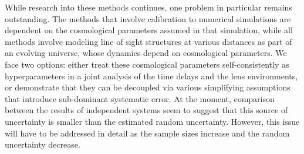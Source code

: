 While research into these methods continues, one problem in particular
remains outstanding. The methods that involve calibration to numerical
simulations are dependent on the cosmological parameters assumed in
that simulation, while all methods involve modeling line of sight
structures at various distances as part of an evolving universe, whose
dynamics depend on cosmological parameters. We face two options:
either treat these cosmological parameters self-consistently as
hyperparameters in a joint analysis of the time delays and the lens
environments, or demonstrate that they can be decoupled via various
simplifying assumptions that introduce sub-dominant systematic
error. At the moment, comparison between the results of independent
systems \citep{Suy++13} seem to suggest that this source of
uncertainty is smaller than the estimated random uncertainty. However,
this issue will have to be addressed in detail as the sample sizes
increase and the random uncertainty decrease.
